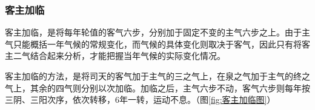 \documentclass[12pt]{ctexbook}
\begin{document}
\subsubsection{客主加临}%

客主加临，是将每年轮值的客气六步，分别加于固定不变的主气六步之上。由于主气只能概括一年气候的常规变化，而气候的具体变化则取决于客气，因此只有将客主二气结合起来分析，才能把握当年气候的实际变化情况。

客主加临的方法，是将司天的客气加于主气的三之气上，在泉之气加于主气的终之气上，其余的四气则分别以次加临。加临之后，主气六步不动，客气六步则每年按三阴、三阳次序，依次转移，6年一转，运动不息。（图\ref{fig:客主加临图}）

\end{document}

